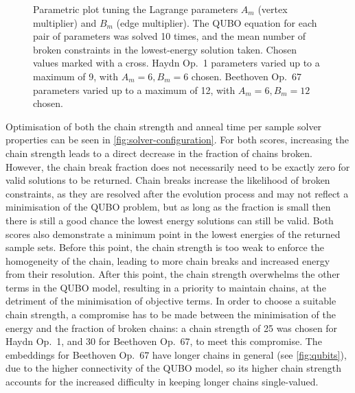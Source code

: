 \documentclass[12pt]{article}
\theoremstyle{definition}
\begin{document}
\begin{figure}[ht]
    \centering\tiny
    \begin{subfigure}{.5\textwidth}
        
        \caption{}
        \label{fig:haydn-lagrange}
    \end{subfigure}\hfill
    \begin{subfigure}{.5\textwidth}
        
        \caption{}
        \label{fig:beethoven-lagrange}
    \end{subfigure}
    \caption{Parametric plot tuning the Lagrange parameters $A_m$ (vertex multiplier) and $B_m$ (edge multiplier). The QUBO equation for each pair of parameters was solved 10 times, and the mean number of broken constraints in the lowest-energy solution taken. Chosen values marked with a cross. \textbf{} Haydn Op.\ 1 parameters varied up to a maximum of 9, with $A_m=6,B_m=6$ chosen. \textbf{} Beethoven Op.\ 67 parameters varied up to a maximum of 12, with $A_m=6,B_m=12$ chosen.}
    \label{fig:lagrange}
\end{figure}

Optimisation of both the chain strength and anneal time per sample solver properties can be seen in \cref{fig:solver-configuration}. For both scores, increasing the chain strength leads to a direct decrease in the fraction of chains broken. However, the chain break fraction does not necessarily need to be exactly zero for valid solutions to be returned. Chain breaks increase the likelihood of broken constraints, as they are resolved after the evolution process and may not reflect a minimisation of the QUBO problem, but as long as the fraction is small then there is still a good chance the lowest energy solutions can still be valid. Both scores also demonstrate a minimum point in the lowest energies of the returned sample sets. Before this point, the chain strength is too weak to enforce the homogeneity of the chain, leading to more chain breaks and increased energy from their resolution. After this point, the chain strength overwhelms the other terms in the QUBO model, resulting in a priority to maintain chains, at the detriment of the minimisation of objective terms. In order to choose a suitable chain strength, a compromise has to be made between the minimisation of the energy and the fraction of broken chains: a chain strength of \num{25} was chosen for Haydn Op.\ 1, and \num{30} for Beethoven Op.\ 67, to meet this compromise. The embeddings for Beethoven Op.\ 67 have longer chains in general (see \cref{fig:qubits}), due to the higher connectivity of the QUBO model, so its higher chain strength accounts for the increased difficulty in keeping longer chains single-valued.
\end{document}
